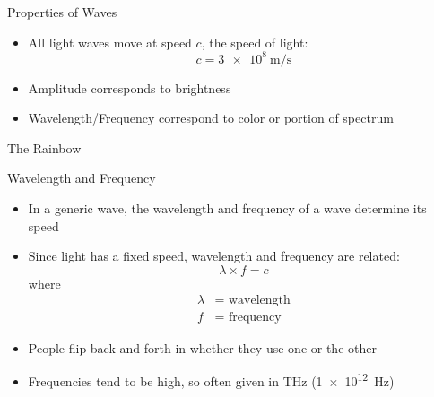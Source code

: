 \documentclass[pdf,aspectratio=169]{beamer}
\begin{document}
\begin{frame}{Properties of Waves}
  \begin{center}
  \end{center}
  \begin{itemize}
	\item All light waves move at speed $c$, the speed of light:
	  \[c = \SI{3e8}{\meter\per\second}\]
	\item Amplitude corresponds to brightness
	\item Wavelength/Frequency correspond to color or portion of spectrum
  \end{itemize}
\end{frame}

\begin{frame}{The Rainbow}
  \begin{center}
  \end{center}
\end{frame}

\begin{frame}{Wavelength and Frequency}
  \begin{itemize}
	\item In a generic wave, the wavelength and frequency of a wave determine its speed
	\item Since light has a fixed speed, wavelength and frequency are related:
	  \[\lambda \times f = c\]
	  where
	  \begin{align*}
		\lambda &= \text{ wavelength} \\
		f &= \text{ frequency}
	  \end{align*}
	\item People flip back and forth in whether they use one or the other
	\item Frequencies tend to be high, so often given in \si{\tera\hertz} (\SI{1e12}{\hertz})
  \end{itemize}
\end{frame}
\end{document}
